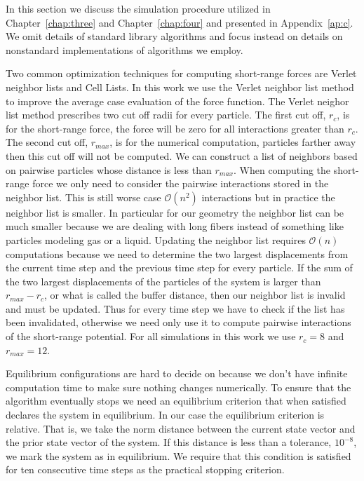    In this section we discuss the simulation procedure utilized in Chapter~\ref{chap:three} and Chapter~\ref{chap:four} and presented in Appendix~\ref{ap:c}. We omit details of standard library algorithms and focus instead on details on nonstandard implementations of algorithms we employ.

Two common optimization techniques for computing short-range forces are Verlet neighbor lists and Cell Lists.
In this work we use the Verlet neighbor list method to improve the average case evaluation of the force function.
The Verlet neighor list method prescribes two cut off radii for every particle. 
The first cut off, $r_c$, is for the short-range force, the force will be zero for all interactions greater than $r_c$.
The second cut off, $r_{max}$, is for the numerical computation, particles farther away then this cut off will not be computed.
We can construct a list of neighbors based on pairwise particles whose distance is less than $r_{max}$. 
When computing the short-range force we only need to consider the pairwise interactions stored in the neighbor list. This is still worse case $\mathcal{O}(n^2)$ interactions but in practice the neighbor list is smaller.
In particular for our geometry the neighbor list can be much smaller because we are dealing with long fibers instead of something like particles modeling gas or a liquid.
Updating the neighbor list requires $\mathcal{O}(n)$ computations because we need to determine the two largest displacements from the current time step and the previous time step for every particle.
If the sum of the two largest displacements of the particles of the system is larger than $r_{max} - r_c$, or what is called the buffer distance, then our neighbor list is invalid and must be updated.
Thus for every time step we have to check if the list has been invalidated, otherwise we need only use it to compute pairwise interactions of the short-range potential.
For all simulations in this work we use $r_c = 8$ and $r_{max} = 12$.

   Equilibrium configurations are hard to decide on because we don't have infinite computation time to make sure nothing changes numerically. To ensure that the algorithm eventually stops we need an equilibrium criterion that when satisfied declares the system in equilibrium. In our case the equilibrium criterion is relative. That is, we take the norm distance between the current state vector and the prior state vector of the system. If this distance is less than a tolerance, $10^{-8}$, we mark the system as in equilibrium. We require that this condition is satisfied for ten consecutive time steps as the practical stopping criterion.
   

